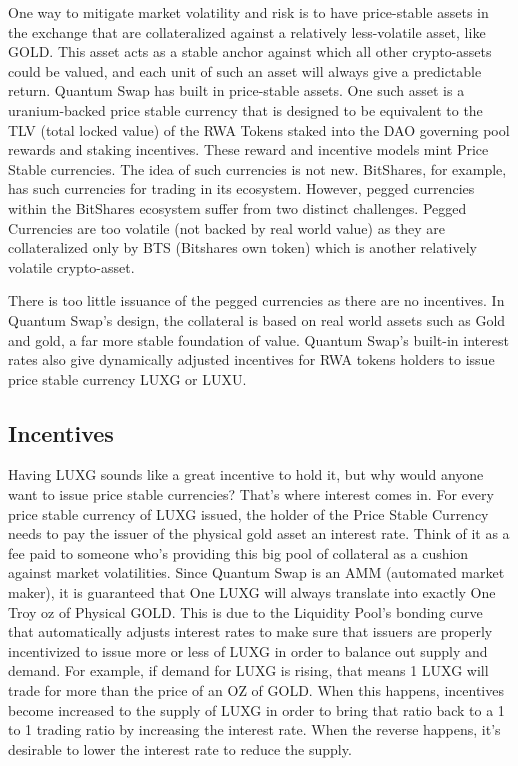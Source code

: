 \documentclass[11pt]{article}
\begin{document}
One way to mitigate market volatility and risk is to have price-stable assets in the exchange that are collateralized against a relatively less-volatile asset, like GOLD. This asset acts as a stable anchor against which all other crypto-assets could be valued, and each unit of such an asset will always give a predictable return. Quantum Swap has built in price-stable assets. One such asset is a uranium-backed price stable currency that is designed to be equivalent to the TLV (total locked value) of the RWA Tokens staked into the DAO governing pool rewards and staking incentives. These reward and incentive models mint Price Stable currencies. The idea of such currencies is not new. BitShares, for example, has such currencies for trading in its ecosystem. However, pegged currencies within the BitShares ecosystem suffer from two distinct challenges. Pegged Currencies are too volatile (not backed by real world value) as they are collateralized only by BTS (Bitshares own token) which is another relatively volatile crypto-asset.


There is too little issuance of the pegged currencies as there are no incentives. In Quantum Swap's design, the collateral is based on real world assets such as Gold and gold, a far more stable foundation of value. Quantum Swap's built-in interest rates also give dynamically adjusted incentives for RWA tokens holders to issue price stable currency LUXG or LUXU.


\subsection{Incentives}

Having LUXG sounds like a great incentive to hold it, but why would anyone want to issue price stable currencies? That's where interest comes in. For every price stable currency of LUXG issued, the holder of the Price Stable Currency needs to pay the issuer of the physical gold asset an interest rate. Think of it as a fee paid to someone who's providing this big pool of collateral as a cushion against market volatilities. Since Quantum Swap is an AMM (automated market maker), it is guaranteed that One LUXG will always translate into exactly One Troy oz of Physical GOLD. This is due to the Liquidity Pool's bonding curve that automatically adjusts interest rates to make sure that issuers are properly incentivized to issue more or less of LUXG in order to balance out supply and demand. For example, if demand for LUXG is rising, that means 1 LUXG will trade for more than the price of an OZ of GOLD. When this happens, incentives become increased to the supply of LUXG in order to bring that ratio back to a 1 to 1 trading ratio by increasing the interest rate. When the reverse happens, it's desirable to lower the interest rate to reduce the supply.
\end{document}
